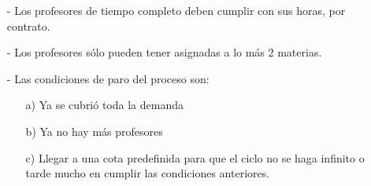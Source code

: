   \begin{itemize}

\item[-] Los profesores de tiempo completo deben cumplir con sus horas, por contrato.

\item[-] Los profesores sólo pueden tener asignadas a lo más 2 materias.

\item[-] Las condiciones de paro del proceso son:
  
  \begin{itemize}
\item[a)] Ya se cubrió toda la demanda

\item[b)] Ya no hay más profesores

\item[c)] Llegar a una cota predefinida para que el ciclo no se haga infinito o tarde mucho en cumplir las condiciones anteriores.
\end{itemize}
\end{itemize}